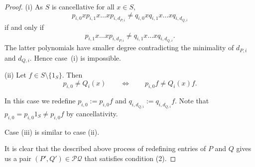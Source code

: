 \documentclass[10pt,a4paper]{amsart}
\begin{document}
\begin{proof}
(i) As \(S\) is cancellative for all \(x\in S\),
\[p_{i,0}xp_{i, 1}x \ldots xp_{i, d_{P,i}} \neq q_{i,0}xq_{i, 1}x \ldots xq_{i, d_{Q,i}}\]
if and only if 
\[p_{i, 1}x \ldots xp_{i, d_{P,i}} \neq q_{i, 1}x \ldots xq_{i, d_{Q,i}}.\]
The latter polynomials have smaller degree contradicting the minimality of \(d_{P,i}\) and \(d_{Q,i}\). Hence case~(i) is impossible.

(ii) Let \(f\in S\setminus \{1_{S}\}\).
Then
\[p_{i, 0} \neq Q_{i}(x)\qquad \iff \qquad p_{i, 0}f \neq Q_{i}(x)f.\]

In this case we redefine \(p_{i, 0}:= 
p_{i, 0}f\) and \(q_{i, d_{Q,i}}:= q_{i, d_{Q,i}}f\). 
Note that \(p_{i,0}=p_{i, 0}1_S\neq p_{i, 0}f\) by cancellativity.

Case (iii) is similar to case (ii).

It is clear that the described above process of redefining entries of $P$ and $Q$ gives us a pair $(P',Q')\in\mathcal{PQ}$ that satisfies condition (2).
\end{proof}
\end{document}
